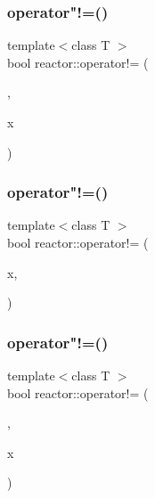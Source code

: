\mbox{\label{namespacereactor_a43398d2b182f1f579ce7d26b88c8ca97}} 
\subsubsection{\texorpdfstring{operator"!=()}{operator!=()}\hspace{0.1cm}{\footnotesize\ttfamily [9/11]}}
{\footnotesize\ttfamily template$<$class T $>$ \\
bool reactor\+::operator!= (\begin{DoxyParamCaption}\item[{std\+::nullptr\+\_\+t}]{,  }\item[{const \hyperlink{classreactor_1_1MutableValuePtr}{Mutable\+Value\+Ptr}$<$ T $>$ \&}]{x }\end{DoxyParamCaption})}

\mbox{\label{namespacereactor_ace39af7a63437facb0d3a59aa87e59b8}} 
\subsubsection{\texorpdfstring{operator"!=()}{operator!=()}\hspace{0.1cm}{\footnotesize\ttfamily [10/11]}}
{\footnotesize\ttfamily template$<$class T $>$ \\
bool reactor\+::operator!= (\begin{DoxyParamCaption}\item[{const \hyperlink{classreactor_1_1ImmutableValuePtr}{Immutable\+Value\+Ptr}$<$ T $>$ \&}]{x,  }\item[{std\+::nullptr\+\_\+t}]{ }\end{DoxyParamCaption})}

\mbox{\label{namespacereactor_a84d02734e8877c36a53e02a6228348bf}} 
\subsubsection{\texorpdfstring{operator"!=()}{operator!=()}\hspace{0.1cm}{\footnotesize\ttfamily [11/11]}}
{\footnotesize\ttfamily template$<$class T $>$ \\
bool reactor\+::operator!= (\begin{DoxyParamCaption}\item[{std\+::nullptr\+\_\+t}]{,  }\item[{const \hyperlink{classreactor_1_1ImmutableValuePtr}{Immutable\+Value\+Ptr}$<$ T $>$ \&}]{x }\end{DoxyParamCaption})}

